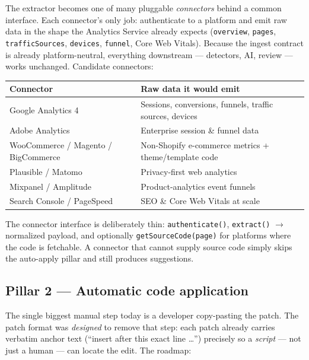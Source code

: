 \documentclass[11pt,a4paper]{article}
\begin{document}
The extractor becomes one of many pluggable \emph{connectors} behind a common
interface. Each connector's only job: authenticate to a platform and emit raw
data in the shape the Analytics Service already expects
(\texttt{overview}, \texttt{pages}, \texttt{trafficSources}, \texttt{devices},
\texttt{funnel}, Core Web Vitals). Because the ingest contract is already
platform-neutral, everything downstream --- detectors, AI, review --- works
unchanged. Candidate connectors:

\begin{center}
\begin{tabularx}{\textwidth}{@{}l Y@{}}
\toprule
\textbf{Connector} & \textbf{Raw data it would emit}\\
\midrule
Google Analytics 4 & Sessions, conversions, funnels, traffic sources, devices\\
Adobe Analytics & Enterprise session \& funnel data\\
WooCommerce / Magento / BigCommerce & Non-Shopify e-commerce metrics + theme/template code\\
Plausible / Matomo & Privacy-first web analytics\\
Mixpanel / Amplitude & Product-analytics event funnels\\
Search Console / PageSpeed & SEO \& Core Web Vitals at scale\\
\bottomrule
\end{tabularx}
\end{center}

The connector interface is deliberately thin: \texttt{authenticate()},
\texttt{extract()} $\rightarrow$ normalized payload, and optionally
\texttt{getSourceCode(page)} for platforms where the code is fetchable. A
connector that cannot supply source code simply skips the auto-apply pillar and
still produces suggestions.

\subsection{Pillar 2 --- Automatic code application}

The single biggest manual step today is a developer copy-pasting the patch. The
patch format was \emph{designed} to remove that step: each patch already carries
verbatim anchor text (``insert after this exact line \dots'') precisely so a
\emph{script} --- not just a human --- can locate the edit. The roadmap:
\end{document}
